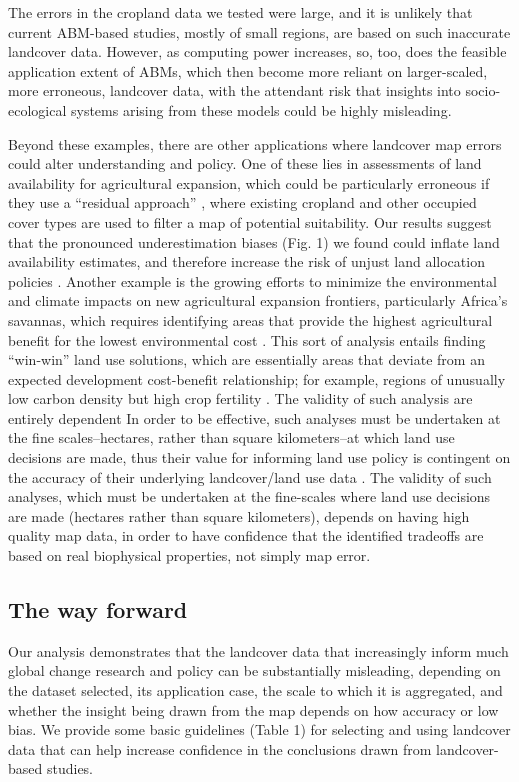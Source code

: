 \documentclass{pnastwo2}
\begin{document}
\begin{article}
The errors in the cropland data we tested were large, and it is unlikely that current ABM-based studies, mostly of small regions, are based on such inaccurate landcover data. However, as computing power increases, so, too, does the feasible application extent of ABMs, which then become more reliant on larger-scaled, more erroneous, landcover data, with the attendant risk that insights into socio-ecological systems arising from these models could be highly misleading.  

Beyond these examples, there are other applications where landcover map errors could alter understanding and policy. One of these lies in assessments of land availability for agricultural expansion, which could be particularly erroneous if they use a ``residual approach'' \cite{lambin_estimating_????}, where existing cropland and other occupied cover types are used to filter a map of potential suitability. Our results suggest that the pronounced underestimation biases (Fig. 1) we found could inflate land availability estimates, and therefore increase the risk of unjust land allocation policies \cite{rulli_global_2013}. Another example is the growing efforts to minimize the environmental and climate impacts on new agricultural expansion frontiers, particularly Africa's savannas, which requires identifying areas that provide the highest agricultural benefit for the lowest environmental cost \cite{searchinger_high_2015}. This sort of analysis entails finding ``win-win'' land use solutions, which are essentially areas that deviate from an expected development cost-benefit relationship; for example, regions of unusually low carbon density but high crop fertility \cite{searchinger_high_2015}. The validity of such analysis are entirely dependent In order to be effective, such analyses must be undertaken at the fine scales--hectares, rather than square kilometers--at which land use decisions are made, thus their value for informing land use policy is contingent on the accuracy of their underlying landcover/land use data \cite{searchinger_high_2015}. The validity of such analyses, which must be undertaken at the fine-scales where land use decisions are made (hectares rather than square kilometers), depends on having high quality map data, in order to have confidence that the identified tradeoffs are based on real biophysical properties, not simply map error.

\subsection{The way forward}
Our analysis demonstrates that the landcover data that increasingly inform much global change research and policy can be substantially misleading, depending on the dataset selected, its application case, the scale to which it is aggregated, and whether the insight being drawn from the map depends on how accuracy or low bias. We provide some basic guidelines (Table 1) for selecting and using landcover data that can help increase confidence in the conclusions drawn from landcover-based studies. 


\end{article}
\end{document}
